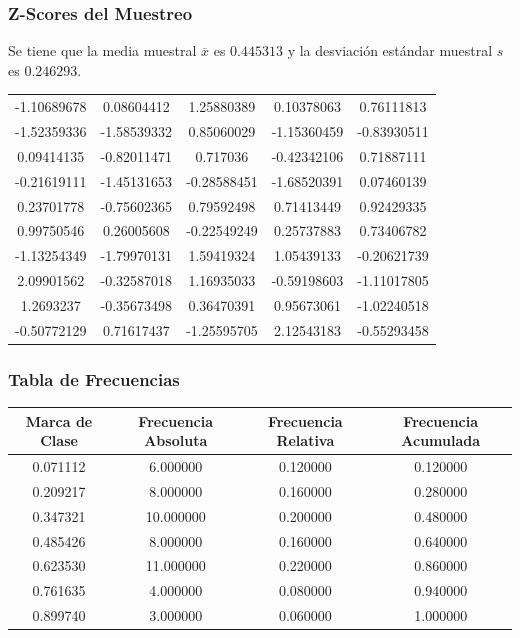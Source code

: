 \documentclass[12pt,a4paper]{article}
\begin{document}
    \subsubsection{Z-Scores del Muestreo}
        Se tiene que la media muestral $\overline{x}$ es $0.445313$ y la 
        desviación estándar muestral $s$ es $0.246293$.
        \begin{center}
            \begin{tabular}{ccccc}
                -1.10689678 &  0.08604412 &  1.25880389 &  0.10378063 &  0.76111813 \\
                -1.52359336 & -1.58539332 &  0.85060029 & -1.15360459 & -0.83930511 \\
                 0.09414135 & -0.82011471 &  0.717036   & -0.42342106 &  0.71887111 \\
                -0.21619111 & -1.45131653 & -0.28588451 & -1.68520391 &  0.07460139 \\
                 0.23701778 & -0.75602365 &  0.79592498 &  0.71413449 &  0.92429335 \\
                 0.99750546 &  0.26005608 & -0.22549249 &  0.25737883 &  0.73406782 \\
                -1.13254349 & -1.79970131 &  1.59419324 &  1.05439133 & -0.20621739 \\
                 2.09901562 & -0.32587018 &  1.16935033 & -0.59198603 & -1.11017805 \\
                 1.2693237  & -0.35673498 &  0.36470391 &  0.95673061 & -1.02240518 \\
                -0.50772129 &  0.71617437 & -1.25595705 &  2.12543183 & -0.55293458 \\
            \end{tabular}
        \end{center}

    \subsubsection{Tabla de Frecuencias}
        \begin{center}
            \begin{tabular}{|c|c|c|c|}
                \hline
                Marca de Clase & Frecuencia Absoluta & Frecuencia Relativa & Frecuencia Acumulada \\
                \hline
                0.071112 & 6.000000 & 0.120000 & 0.120000 \\
                0.209217 & 8.000000 & 0.160000 & 0.280000 \\
                0.347321 & 10.000000 & 0.200000 & 0.480000 \\
                0.485426 & 8.000000 & 0.160000 & 0.640000 \\
                0.623530 & 11.000000 & 0.220000 & 0.860000 \\
                0.761635 & 4.000000 & 0.080000 & 0.940000 \\
                0.899740 & 3.000000 & 0.060000 & 1.000000 \\
                \hline
            \end{tabular}
        \end{center} 
\end{document}

